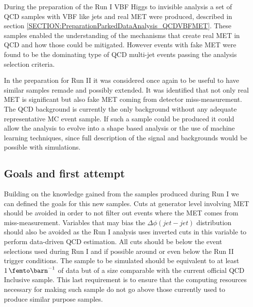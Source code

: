 
During the preparation of the Run I \gls{VBF} Higgs to invisible analysis a set of \gls{QCD} samples with \gls{VBF} like jets and real \gls{MET} were produced, described in section \ref{SECTION:PreparationParkedDataAnalysis_QCDVBFMET}. These samples enabled the understanding of the mechanisms that create real \gls{MET} in \gls{QCD} and how those could be mitigated. However events with fake \gls{MET} were found to be the dominating type of QCD multi-jet events passing the analysis selection criteria. 

In the preparation for Run II it was considered once again to be useful to have similar samples remade and possibly extended. It was identified that not only real \gls{MET} is significant but also fake \gls{MET} coming from detector miss-measurement. The \gls{QCD} background is currently the only background without any adequate representative \gls{MC} event sample. If such a sample could be produced it could allow the analysis to evolve into a shape based analysis or the use of machine learning techniques, since full description of the signal and backgrounds would be possible with simulations.

\subsection{Goals and first attempt}
\label{SUBSECTION:RunIIPreparation_GoalsAndFirstAttempt}


Building on the knowledge gained from the samples produced during Run I we can defined the goals for this new samples. Cuts at generator level involving \gls{MET} should be avoided in order to not filter out events where the \gls{MET} comes from miss-measurement. Variables that may bias the $\Delta\phi(jet-jet)$ distribution should also be avoided as the Run I analysis uses inverted cuts in this variable to perform data-driven \gls{QCD} estimation. All cuts should be below the event selections used during Run I and if possible around or even below the Run II trigger conditions. The sample to be simulated should be equivalent to at least $1\,\femto\barn^{-1}$ of data but of a size comparable with the current official \gls{QCD} Inclusive sample. This last requirement is to ensure that the computing resources necessary for making such sample do not go above those currently used to produce similar purpose samples. 

